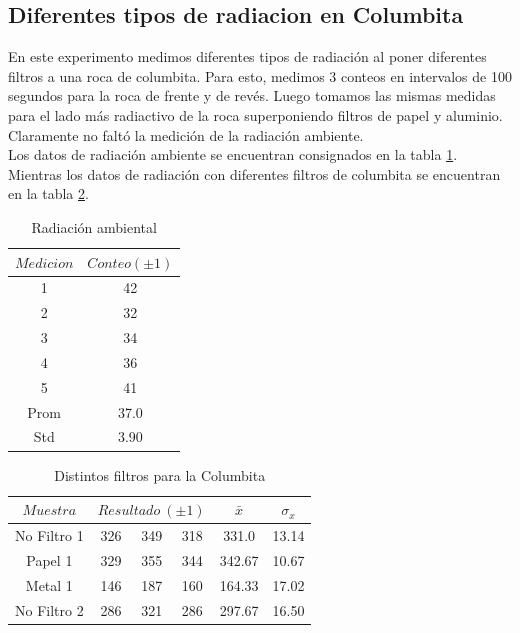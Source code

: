\documentclass[%
 reprint,
 amsmath,amssymb,
 aps,
]{revtex4-1}
\begin{document}
\subsection{\label{sec:level2}Diferentes tipos de radiacion en Columbita}
En este experimento medimos diferentes tipos de radiación al poner diferentes filtros a una roca de columbita. Para esto, medimos 3 conteos en intervalos de 100 segundos para la roca de frente y de revés. Luego tomamos las mismas medidas para el lado más radiactivo de la roca superponiendo filtros de papel y aluminio. Claramente no faltó la medición de la radiación ambiente.\\

Los datos de radiación ambiente se encuentran consignados en la tabla \ref{table:ambiente5}. Mientras los datos de radiación con diferentes filtros de columbita se encuentran en la tabla \ref{table:columbita}.\\


\begin{table}[h!]
\centering
\begin{tabular}{|c|c|}
	\hline $Medicion $ & $ Conteo (\pm 1) $ \\ 
	\hline\hline
	1&42\\
	2&32\\
	3&34\\
	4&36\\
	5&41\\
	Prom&37.0\\
	Std&3.90\\
	[1ex] 
 \hline
 \end{tabular} 
  \caption{Radiación ambiental}
\label{table:ambiente5} 
\end{table}


\begin{table}[h!]
\centering
\begin{tabular}{|c|c|c|c|c|c|}
	\hline $ Muestra $ & \multicolumn{3}{c|}{$Resultado\ (\pm 1)$ } & $\bar{x}$& $\sigma_x$ \\ 
	\hline\hline
	No Filtro 1 &326&349&318&331.0&13.14\\
	Papel 1&329&355&344&342.67&10.67\\
	Metal 1&146&187&160&164.33&17.02\\
	No Filtro 2 &286&321&286&297.67&16.50\\
	[1ex] 
 \hline
 \end{tabular} 
  \caption{Distintos filtros para la Columbita}
\label{table:columbita} 
\end{table}
\end{document}
